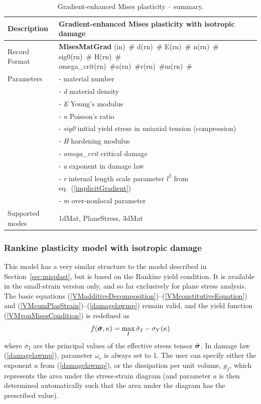 \documentclass[a4paper]{article}
\newcommand{\mbf}[1]{\mbox{\boldmath$#1$}}
\newcommand{\descitem}[1]{{\noindent \bf #1}}
\newcommand{\elemparam}[2]{{{#1\tiny (#2)}~\#}}
\newcommand{\param}[1]{{\it #1}}
\newcommand{\vsig}{\mbf{\sigma}}%
\begin{document}
\begin{table}[!htb]
\begin{tabular}{|l|p{9cm}|}
\hline
Description & Gradient-enhanced Mises plasticity with isotropic damage\\
\hline
Record Format & \descitem{MisesMatGrad}  \elemparam{}{in}
\elemparam{d}{rn} \elemparam{E}{rn} \elemparam{n}{rn} \elemparam{sig0}{rn} \elemparam{H}{rn} \elemparam{omega\_crit}{rn}\elemparam{a}{rn}\elemparam{r}{rn}\elemparam{m}{rn}\\
Parameters &- \param{} material number\\
&- \param{d} material density\\
&- \param{E} Young's modulus\\
&- \param{n} Poisson's ratio\\
&- \param{sig0} initial yield stress in uniaxial tension (compression)\\
&- \param{H} hardening modulus\\
&- \param{omega\_crit} critical damage\\
&- \param{a} exponent in damage law\\
&- \param{r} internal length scale parameter $l^2$ from eq.~(\ref{implicitGradient})\\
&- \param{m} over-nonlocal parameter\\
Supported modes& 1dMat, PlaneStress, 3dMat\\
\hline
\end{tabular}
\caption{Gradient-enhanced Mises plasticity -- summary.}
\label{misesMatGrad_table}
\end{table}



\subsubsection{Rankine plasticity model with isotropic damage}
\label{sec:rankplast}

This model has a very similar structure to the model described in Section~\ref{sec:misplast},
but is based on the Rankine yield condition. It is available in the small-strain version
only, and so far exclusively for plane stress analysis. 
The basic equations (\ref{VMadditiveDecomposition})--(\ref{VMconstitutiveEquation}) 
and (\ref{VMcumPlasStrain})--(\ref{damagelawmp}) remain valid, 
and the yield function (\ref{VMvonMisesCondition}) is redefined as
\begin{equation}\label{RankineCondition}
f(\bar{\vsig},\kappa) = \max_{I}\bar\sigma_I-\sigma_Y(\kappa)
\end{equation}
where $\bar\sigma_I$ are the principal values of the effective stress tensor $\bar{\vsig}$. 
In damage law (\ref{damagelawmp}), parameter $\omega_c$ is always set to 1.
The user can specify either the exponent $a$ from (\ref{damagelawmp}),
or the dissipation per unit volume, $g_f$, which represents the area under the
stress-strain diagram (and parameter $a$ is then determined automatically such that
the area under the diagram has the prescribed value).
\end{document}
